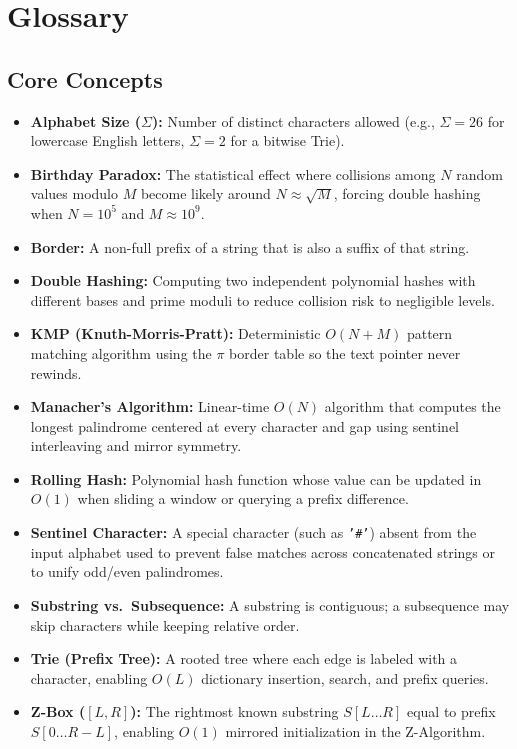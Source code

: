 \documentclass[11pt,a4paper]{article}
\theoremstyle{definition}
\begin{document}
\section{Glossary}

\subsection*{Core Concepts}
\begin{itemize}
    \item \textbf{Alphabet Size ($\Sigma$):} Number of distinct characters allowed (e.g., $\Sigma = 26$ for lowercase English letters, $\Sigma = 2$ for a bitwise Trie).
    \item \textbf{Birthday Paradox:} The statistical effect where collisions among $N$ random values modulo $M$ become likely around $N \approx \sqrt{M}$, forcing double hashing when $N = 10^5$ and $M \approx 10^9$.
    \item \textbf{Border:} A non-full prefix of a string that is also a suffix of that string.
    \item \textbf{Double Hashing:} Computing two independent polynomial hashes with different bases and prime moduli to reduce collision risk to negligible levels.
    \item \textbf{KMP (Knuth-Morris-Pratt):} Deterministic $O(N + M)$ pattern matching algorithm using the $\pi$ border table so the text pointer never rewinds.
    \item \textbf{Manacher's Algorithm:} Linear-time $O(N)$ algorithm that computes the longest palindrome centered at every character and gap using sentinel interleaving and mirror symmetry.
    \item \textbf{Rolling Hash:} Polynomial hash function whose value can be updated in $O(1)$ when sliding a window or querying a prefix difference.
    \item \textbf{Sentinel Character:} A special character (such as \texttt{'\#'}) absent from the input alphabet used to prevent false matches across concatenated strings or to unify odd/even palindromes.
    \item \textbf{Substring vs.\ Subsequence:} A substring is contiguous; a subsequence may skip characters while keeping relative order.
    \item \textbf{Trie (Prefix Tree):} A rooted tree where each edge is labeled with a character, enabling $O(L)$ dictionary insertion, search, and prefix queries.
    \item \textbf{Z-Box ($[L, R]$):} The rightmost known substring $S[L \dots R]$ equal to prefix $S[0 \dots R - L]$, enabling $O(1)$ mirrored initialization in the Z-Algorithm.
\end{itemize}
\end{document}

